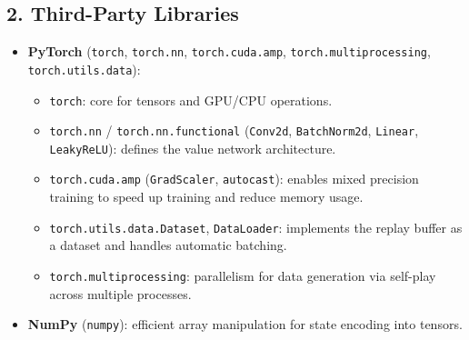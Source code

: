 \documentclass{report}
\begin{document}
\subsection*{2. Third-Party Libraries}
\begin{itemize}
  \item \textbf{PyTorch} (\texttt{torch}, \texttt{torch.nn}, \texttt{torch.cuda.amp}, \texttt{torch.multiprocessing}, \texttt{torch.utils.data}):
    \begin{itemize}
      \item \texttt{torch}: core for tensors and GPU/CPU operations.
      \item \texttt{torch.nn} / \texttt{torch.nn.functional} (\texttt{Conv2d}, \texttt{BatchNorm2d}, \texttt{Linear}, \texttt{LeakyReLU}): defines the value network architecture.
      \item \texttt{torch.cuda.amp} (\texttt{GradScaler}, \texttt{autocast}): enables mixed precision training to speed up training and reduce memory usage.
      \item \texttt{torch.utils.data.Dataset}, \texttt{DataLoader}: implements the replay buffer as a dataset and handles automatic batching.
      \item \texttt{torch.multiprocessing}: parallelism for data generation via self-play across multiple processes.
    \end{itemize}
  \item \textbf{NumPy} (\texttt{numpy}): efficient array manipulation for state encoding into tensors.
\end{itemize}
\end{document}
